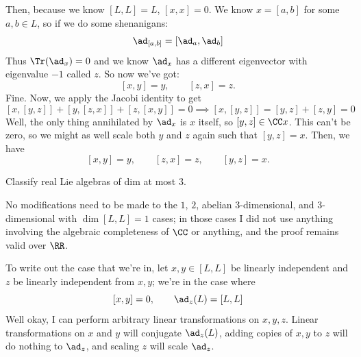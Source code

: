 \documentclass[11pt, headheight=30pt]{scrartcl}
\begin{document}
Then, because we know $[L,L] = L$, $[x,x] = 0$.
We know $x = [a,b]$ for some $a,b\in L$, so
if we do some shenanigans:
\[
    \ad_{[a,b]} = [\ad_a, \ad_b]
\]
Thus $\Tr(\ad_{x}) = 0$ and we know $\ad_x$ has a different eigenvector
with eigenvalue $-1$ called $z$. So now we've got:
\[
    [x,y] = y, \qquad [z,x] = z.    
\]
Fine. Now, we apply the Jacobi identity to get
\[
    [x, [y,z]] + [y, [z,x]] + [z, [x,y]] = 0\implies [x, [y,z]] = [y,z] + [z,y] = 0
\]
Well, the only thing annihilated by $\ad_x$ is $x$ itself,
so $[y,z] \in \CC x$. This can't be zero, so we might as well
scale both $y$ and $z$ again such that $[y,z] = x$.
Then, we have
\[
    [x,y] = y, \qquad [z,x] = z, \qquad [y,z] = x.    
\]





\begin{prob}
    Classify real Lie algebras of dim at most $3$.
\end{prob}

No modifications need to be made to the $1$, $2$,
abelian $3$-dimensional, and $3$-dimensional with $\dim [L,L] = 1$
cases; in those cases I did not use anything involving the algebraic
completeness of $\CC$ or anything, and the proof remains
valid over $\RR$.

\begin{rcase*}
\end{rcase*}

To write out the case that we're in,
let $x,y \in [L,L]$ be linearly independent and $z$ be linearly independent
from $x,y$; we're in the case where
\[
    [x,y] = 0, \qquad \ad_z(L) = [L,L]    
\]
Well okay, I can perform arbitrary linear transformations
on $x,y,z$. Linear transformations on $x$ and $y$ will
conjugate $\ad_z(L)$, adding copies of $x,y$ to $z$ will
do nothing to $\ad_z$, and scaling $z$ will scale $\ad_z$.
\end{document}
